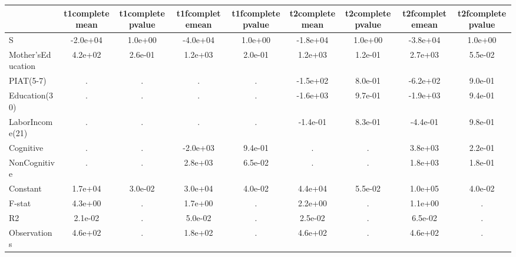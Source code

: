 \begin{table}[htbp]
\begin{tabular}{lcccccccc} \hline \hline
 & t1completemean  & t1completepvalue  & t1fcompletemean  & t1fcompletepvalue  & t2completemean  & t2completepvalue  & t2fcompletemean  & t2fcompletepvalue  \\  \hline 
S & -2.0e+04 &  1.0e+00 & -4.0e+04 &  1.0e+00 & -1.8e+04 &  1.0e+00 & -3.8e+04 &  1.0e+00 \\  
Mother'sEducation &  4.2e+02 &  2.6e-01 &  1.2e+03 &  2.0e-01 &  1.2e+03 &  1.2e-01 &  2.7e+03 &  5.5e-02 \\  
PIAT(5-7) &         . &         . &         . &         . & -1.5e+02 &  8.0e-01 & -6.2e+02 &  9.0e-01 \\  
Education(30) &         . &         . &         . &         . & -1.6e+03 &  9.7e-01 & -1.9e+03 &  9.4e-01 \\  
LaborIncome(21) &         . &         . &         . &         . & -1.4e-01 &  8.3e-01 & -4.4e-01 &  9.8e-01 \\  
Cognitive &         . &         . & -2.0e+03 &  9.4e-01 &         . &         . &  3.8e+03 &  2.2e-01 \\  
NonCognitive &         . &         . &  2.8e+03 &  6.5e-02 &         . &         . &  1.8e+03 &  1.8e-01 \\  
Constant &  1.7e+04 &  3.0e-02 &  3.0e+04 &  4.0e-02 &  4.4e+04 &  5.5e-02 &  1.0e+05 &  4.0e-02 \\  
F-stat &  4.3e+00 &         . &  1.7e+00 &         . &  2.2e+00 &         . &  1.1e+00 &         . \\  
R2 &  2.1e-02 &         . &  5.0e-02 &         . &  2.5e-02 &         . &  6.5e-02 &         . \\  
Observations &  4.6e+02 &         . &  1.8e+02 &         . &  4.6e+02 &         . &  4.6e+02 &         . \\  
\hline \hline \end{tabular}
\end{table}
